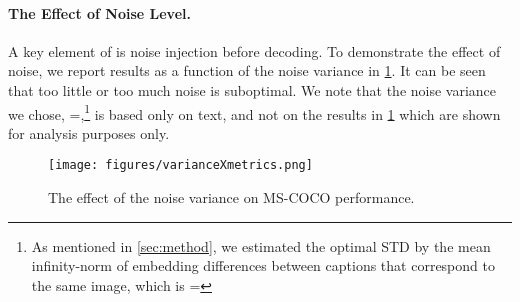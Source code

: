 \paragraph{The Effect of Noise Level.}
A key element of \modelname{} is noise injection before decoding. 
To demonstrate the effect of noise, we report results as a function of the noise variance  in \cref{figures:varianceXmetrics.png}. It can be seen that too little or too much noise is suboptimal. We note that the noise variance we chose, =,\footnote{As mentioned in \cref{sec:method}, we estimated the optimal STD by the mean infinity-norm of embedding differences between captions that correspond to the same image, which is =} is based only on text, and not on the results in \cref{figures:varianceXmetrics.png} which are shown for analysis purposes only.

\begin{figure}
\centering
\texttt{[image: figures/varianceXmetrics.png]}
\caption{\label{figures:varianceXmetrics.png}{The effect of the noise variance on MS-COCO performance.}}
\end{figure}















